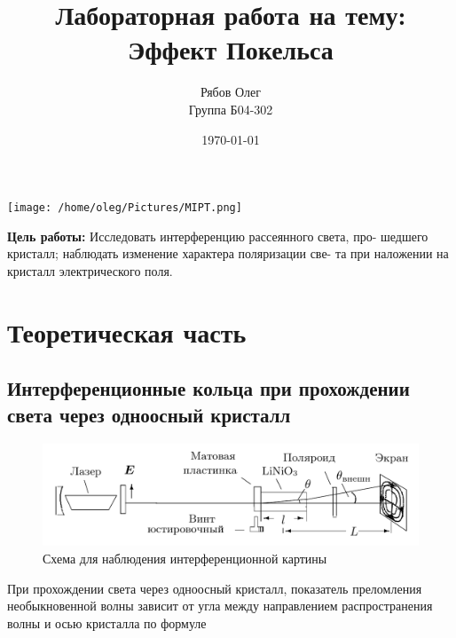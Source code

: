 \documentclass{article}
\begin{document}
\begin{titlepage}
    \title{Лабораторная работа на тему: \\
    Эффект Покельса}
    \author{Рябов Олег \\
    Группа Б04-302}
    \date{\today}
    \maketitle
    \vfill
    \begin{center}
        \texttt{[image: /home/oleg/Pictures/MIPT.png]}
    \end{center}
\end{titlepage}

\setcounter{page}{2}
\tableofcontents
\newpage



\maketitle
\newpage
{}

\textbf{Цель работы:} Исследовать интерференцию рассеянного света, про-
шедшего кристалл; наблюдать изменение характера поляризации све-
та при наложении на кристалл электрического поля.

\section{Теоретическая часть}
\subsection{Интерференционные кольца при прохождении света через одноосный кристалл}
\begin{figure}[h]
    \center\includegraphics[width = 0.8\linewidth]{ustanovka_kolca.png}
    \caption{Схема для наблюдения интерференционной картины}\label{fig:ustanovka_kolca}
\end{figure}

При прохождении света через одноосный кристалл, показатель преломления необыкновенной
волны зависит от угла между направлением распространения волны и осью кристалла
по формуле
\end{document}

